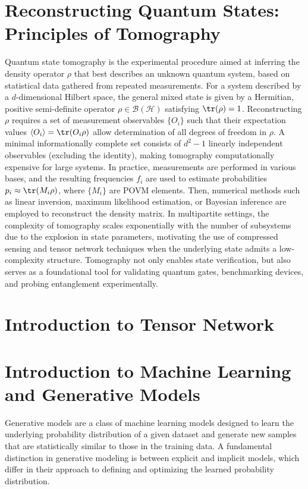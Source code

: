 \section{Reconstructing Quantum States: Principles of Tomography}
Quantum state tomography is the experimental procedure aimed at inferring the density operator $\rho$ that best describes an unknown quantum system, based on statistical data gathered from repeated measurements. For a system described by a $d$-dimensional Hilbert space, the general mixed state is given by a Hermitian, positive semi-definite operator $\rho \in \mathcal{B}(\mathcal{H})$ satisfying $\tr(\rho) = 1$. Reconstructing $\rho$ requires a set of measurement observables $\{O_i\}$ such that their expectation values $\braket{O_i} = \tr(O_i \rho)$ allow determination of all degrees of freedom in $\rho$. A minimal informationally complete set consists of $d^2 - 1$ linearly independent observables (excluding the identity), making tomography computationally expensive for large systems. In practice, measurements are performed in various bases, and the resulting frequencies $f_i$ are used to estimate probabilities $p_i \approx \tr(M_i \rho)$, where $\{M_i\}$ are POVM elements. Then, numerical methods such as linear inversion, maximum likelihood estimation, or Bayesian inference are employed to reconstruct the density matrix. In multipartite settings, the complexity of tomography scales exponentially with the number of subsystems due to the explosion in state parameters, motivating the use of compressed sensing and tensor network techniques when the underlying state admits a low-complexity structure. Tomography not only enables state verification, but also serves as a foundational tool for validating quantum gates, benchmarking devices, and probing entanglement experimentally.

\section{Introduction to Tensor Network}

\lipsum[1-2]

\section{Introduction to Machine Learning and Generative Models}

Generative models are a class of machine learning models designed to learn the underlying probability distribution of a given dataset and generate new samples that are statistically similar to those in the training data. A fundamental distinction in generative modeling is between explicit and implicit models, which differ in their approach to defining and optimizing the learned probability distribution.

